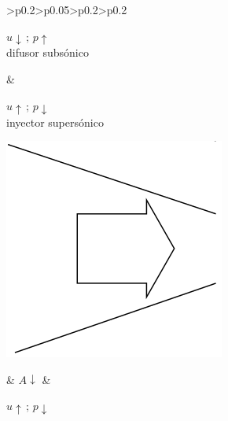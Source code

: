 \begin{center}
\begin{tabular}{>{\centering}p{0.2\columnwidth}>{\centering}p{0.05\columnwidth}>{\centering}p{0.2\columnwidth}>{\centering}p{0.2\columnwidth}}
			\noindent\begin{minipage}[c]{1\linewidth}%
				\begin{center}
					$u\downarrow\,;\,p\uparrow$ \\
					difusor subsónico 
					\par\end{center}%
			\end{minipage} & %
			\noindent\begin{minipage}[c]{1\linewidth}%
				\begin{center}
					$u\uparrow\,;\,p\downarrow$ \\
					inyector supersónico 
					\par\end{center}%
			\end{minipage}\tabularnewline
			\begin{minipage}[c]{4cm}%
				\begin{center}
					\includegraphics[width=\linewidth]{TeX_files/chapter11-Compresible/conducto2b}
				\end{center}
			\end{minipage} & $A\downarrow$  & %
			\noindent\begin{minipage}[c]{1\linewidth}%
				\begin{center}
					$u\uparrow\,;\,p\downarrow$ \\

\end{center}
\end{minipage}
\end{tabular}
\end{center}
